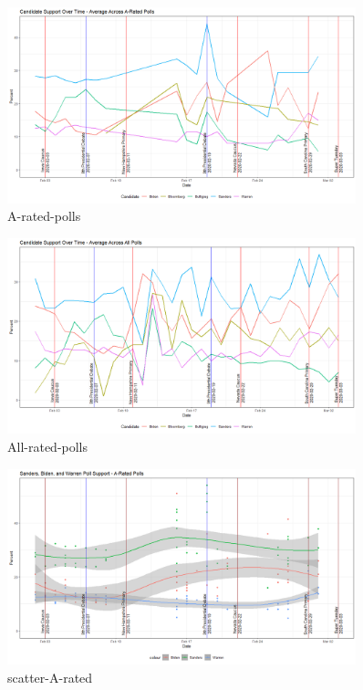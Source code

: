 \begin{figure}[H]
    \centering
    \includegraphics[width=0.9\textwidth]{figures/A-rated-polls.png}
    \caption{A-rated-polls}
    \label{A-rated-polls}
\end{figure}

\begin{figure}[H]
    \centering
    \includegraphics[width=0.9\textwidth]{figures/All-rated-polls.png}
    \caption{All-rated-polls}
    \label{All-rated-polls}
\end{figure}

\begin{figure}[H]
    \centering
    \includegraphics[width=0.9\textwidth]{figures/scatter-A-rated.png}
    \caption{scatter-A-rated}
    \label{scatter-A-rated}
\end{figure}

